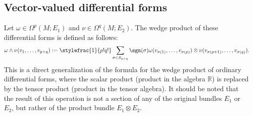 \subsection{Vector-valued differential forms}\label{section:vector_valued_forms}


    \begin{construct}\label{diff:vector_valued_wedge}
        Let $\omega\in\Omega^p(M; E_1)$ and $\nu\in\Omega^q(M; E_2)$. The wedge product of these differential forms is defined as follows:
        \begin{gather}
            \omega\wedge\nu(v_1,\dots,v_{p+q}) := \stylefrac{1}{p!q!}\sum_{\sigma\in S_{p+q}}\sgn(\sigma)\omega(v_{\sigma(1)},\ldots, v_{\sigma(p)})\otimes\nu(v_{\sigma(p+1)},\ldots,v_{\sigma(q)}).
        \end{gather}
        This is a direct generalization of the formula for the wedge product of ordinary differential forms, where the scalar product (product in the algebra $\mathbb{R}$) is replaced by the tensor product (product in the tensor algebra). It should be noted that the result of this operation is not a section of any of the original bundles $E_1$ or $E_2$, but rather of the product bundle $E_1\otimes E_2$.
    \end{construct}

